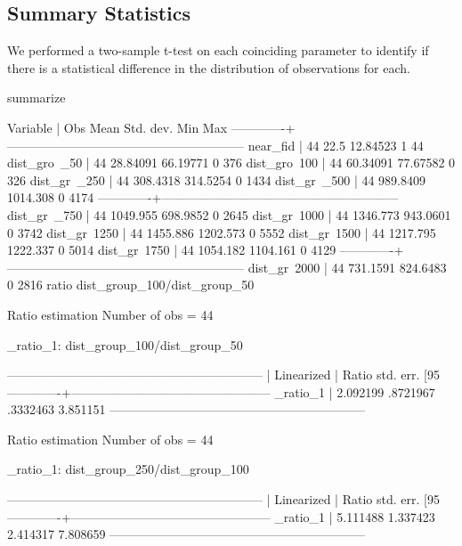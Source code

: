 \documentclass[12pt]{article}
\begin{document}
\subsection{Summary Statistics}

We performed a two-sample t-test on each coinciding parameter to identify if there is a statistical difference in the distribution of observations for each. 

 summarize

    Variable |        Obs        Mean    Std. dev.       Min        Max
-------------+---------------------------------------------------------
    near_fid |         44        22.5    12.84523          1         44
dist_gro~_50 |         44    28.84091    66.19771          0        376
dist_gro~100 |         44    60.34091    77.67582          0        326
dist_gr~_250 |         44    308.4318    314.5254          0       1434
dist_gr~_500 |         44    989.8409    1014.308          0       4174
-------------+---------------------------------------------------------
dist_gr~_750 |         44    1049.955    698.9852          0       2645
dist_gr~1000 |         44    1346.773    943.0601          0       3742
dist_gr~1250 |         44    1455.886    1202.573          0       5552
dist_gr~1500 |         44    1217.795    1222.337          0       5014
dist_gr~1750 |         44    1054.182    1104.161          0       4129
-------------+---------------------------------------------------------
dist_gr~2000 |         44    731.1591    824.6483          0       2816
ratio dist_group_100/dist_group_50

Ratio estimation                            Number of obs = 44

     _ratio_1: dist_group_100/dist_group_50

--------------------------------------------------------------
             |             Linearized
             |      Ratio   std. err.     [95%
-------------+------------------------------------------------
    _ratio_1 |   2.092199   .8721967      .3332463    3.851151
--------------------------------------------------------------

Ratio estimation                            Number of obs = 44

     _ratio_1: dist_group_250/dist_group_100

--------------------------------------------------------------
             |             Linearized
             |      Ratio   std. err.     [95%
-------------+------------------------------------------------
    _ratio_1 |   5.111488   1.337423      2.414317    7.808659
--------------------------------------------------------------
\end{document}
